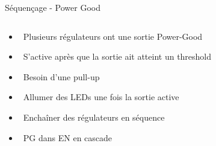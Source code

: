 \begin{frame}{Séquençage - Power Good}
    \begin{columns}
        \begin{column}{0.4\textwidth}
            \vspace{-20pt}
            \begin{itemize}
                \item[] \textcolor{UDSgreenFierte}{\faSignIn*}
                    ~Plusieurs régulateurs ont une sortie Power-Good
                \item[] \textcolor{UDSgreenFierte}{\faStopwatch}
                    ~S'active après que la sortie ait atteint un threshold
                \bigskip
                \item[] \textcolor{UDSgreenFierte}{\faLevelUp*}
                    ~Besoin d'une pull-up
                \bigskip
                \item[] \textcolor{UDSgreenFierte}{\faLightbulb}
                    ~Allumer des LEDs une fois la sortie active
                \item[] \textcolor{UDSgreenFierte}{\faProjectDiagram}
                    ~Enchaîner des régulateurs en séquence
                \item[] \textcolor{UDSgreenFierte}{\faArrowAltCircleRight}
                    ~PG dans EN en cascade
            \end{itemize}
        \end{column}


\end{columns}
\end{frame}
